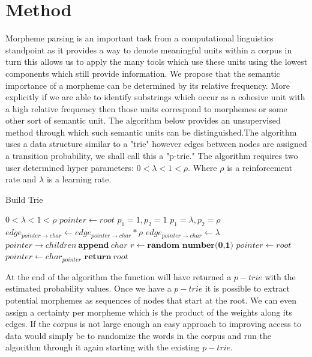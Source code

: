 \documentclass[11pt,a4paper]{article}
\begin{document}
\section{Method}
Morpheme parsing is an important task from a computational linguistics 
standpoint as it provides a way to denote meaningful units within a corpus
in turn this allows us to apply the many tools which use these units using the
lowest components which still provide information. We propose that the 
semantic importance of a morpheme can be determined by its relative frequency.
More explicitly if we are able to identify substrings which occur as a 
cohesive unit with a high relative frequency then those units correspond to 
morphemes or some other sort of semantic unit. The algorithm below provides
an unsupervised method through which such semantic units can be distinguished.The algorithm uses a data structure similar to a "trie" however edges between 
nodes are assigned a transition probability, we shall call this a "p-trie." 
The algorithm requires two user determined hyper parameters: 
$0 < \lambda < 1 < \rho$. Where $\rho$ is a reinforcement rate and 
$\lambda$ is a learning rate.
\begin{algorithm}
\caption{Build Trie}
\begin{algorithmic}
\REQUIRE $0 < \lambda < 1 < \rho$
\STATE $pointer \leftarrow root$
\STATE $p_1 = 1,p_2=1$
\ELSE
\STATE $p_1 = \lambda, p_2 = \rho$
\ENDIF
{}
\STATE $edge_{pointer\to char} \leftarrow edge_{pointer\to char} * \rho$
\ELSE
\STATE $edge_{pointer\to char} \leftarrow \lambda$
\STATE $pointer\to children\ \textbf{append}\ char$
\ENDIF
\STATE $r \leftarrow \textbf{random number(0,1)}$
\STATE $pointer \leftarrow root$
\ELSE
\STATE $pointer \leftarrow char_{pointer}$
\ENDIF
\ENDFOR
\STATE $\textbf{return}\ root$
\end{algorithmic}
\end{algorithm}
At the end of the algorithm the function will have returned a $p-trie$ with
the estimated probability values. Once we have a $p-trie$ it is possible to
extract potential morphemes as sequences of nodes that start at the root. We
can even assign a certainty per morpheme which is the product of the weights 
along its edges. If the corpus is not large enough an easy approach to 
improving access to data would simply be to randomize the words in the corpus
and run the algorithm through it again starting with the existing $p-trie$.
\end{document}
